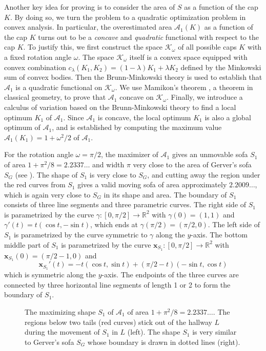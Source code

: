 Another key idea for proving  is to consider the area of \(S\) as a function of the cap \(K\). By doing so, we turn the problem to a quadratic optimization problem in convex analysis. In particular, the overestimated area \(\mathcal{A}_1(K)\) as a function of the cap \(K\) turns out to be a \emph{concave} and \emph{quadratic} functional with respect to the cap \(K\). To justify this, we first construct the space \(\mathcal{K}_\omega\) of all possible caps \(K\) with a fixed rotation angle \(\omega\). The space \(\mathcal{K}_\omega\) itself is a convex space equipped with convex combination \(c_\lambda(K_1, K_2) = (1 - \lambda) K_1 + \lambda K_2\) defined by the Minkowski sum of convex bodies. Then the Brunn-Minkowski theory \cite{schneider_2013} is used to establish that \(\mathcal{A}_1\) is a quadratic functional on \(\mathcal{K}_\omega\). We use Mamikon’s theorem \autocite{mnatsakanianAnnularRingsEqual1997}, a theorem in classical geometry, to prove that \(\mathcal{A}_1\) concave on \(\mathcal{K}_\omega\). Finally, we introduce a calculus of variation based on the Brunn-Minkowski theory to find a local optimum \(K_1\) of \(\mathcal{A}_1\). Since \(\mathcal{A}_1\) is concave, the local optimum \(K_1\) is also a global optimum of \(\mathcal{A}_1\), and  is established by computing the maximum value \(\mathcal{A}_1(K_1) = 1 + \omega^2/2\) of \(\mathcal{A}_1\).

For the rotation angle \(\omega = \pi/2\), the maximizer of \(\mathcal{A}_1\) gives an unmovable sofa \(S_1\) of area \(1 + \pi^2/8 = 2.2337\dots\) and width \(\pi\) very close to the area of Gerver’s sofa \(S_G\) (see ). The shape of \(S_1\) is very close to \(S_G\), and cutting away the region under the red curves from \(S_1\) gives a valid moving sofa of area approximately \(2.2009\dots\), which is again very close to \(S_G\) in its shape and area. The boundary of \(S_1\) consists of three line segments and three parametric curves. The right side of \(S_1\) is parametrized by the curve \(\gamma : [0, \pi/2] \to \mathbb{R}^2\) with \(\gamma(0) = (1, 1)\) and \(\gamma'(t) = t(\cos t, -\sin t)\), which ends at \(\gamma(\pi/2) = (\pi/2, 0)\). The left side of \(S_1\) is parametrized by the curve symmetric to \(\gamma\) along the \(y\)-axis. The bottom middle part of \(S_1\) is parametrized by the curve \(\mathbf{x}_{S_1} : [0, \pi/2] \to \mathbb{R}^2\) with \(\mathbf{x}_{S_1}(0) = (\pi/2-1, 0)\) and
\[
\mathbf{x}_{S_1}'(t) = -t (\cos t, \sin t) + (\pi/2- t) (-\sin t, \cos t)
\]
which is symmetric along the \(y\)-axis. The endpoints of the three curves are connected by three horizontal line segments of length 1 or 2 to form the boundary of \(S_1\).

\begin{figure}
\centering

\caption{The maximizing shape \(S_1\) of \(\mathcal{A}_1\) of area \(1 + \pi^2/8 = 2.2337\dots\). The regions below two tails (red curves) stick out of the hallway \(L\) during the movement of \(S_1\) in \(L\) (left). The shape \(S_1\) is very similar to Gerver’s sofa \(S_G\) whose boundary is drawn in dotted lines (right).}
\label{fig:presofa}
\end{figure}